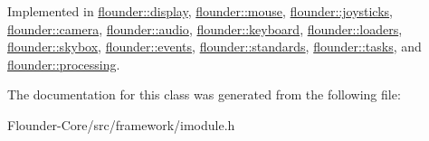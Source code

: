 Implemented in \hyperlink{classflounder_1_1display_a799c6a76fcac1a0ca56dfd6b8d7993fa}{flounder\+::display}, \hyperlink{classflounder_1_1mouse_aa1b1d60e1d1cf4ec7d19eaef65e040bc}{flounder\+::mouse}, \hyperlink{classflounder_1_1joysticks_a346fc03cae7164d6eb927333d1ae725f}{flounder\+::joysticks}, \hyperlink{classflounder_1_1camera_a6b2da3a1c348764d3cf954db5ac5b357}{flounder\+::camera}, \hyperlink{classflounder_1_1audio_aabff6a1996b8571404023b6ac17009b6}{flounder\+::audio}, \hyperlink{classflounder_1_1keyboard_a9fe79eabe905466fd90413d2c3b68841}{flounder\+::keyboard}, \hyperlink{classflounder_1_1loaders_a9becf522a74f35f7e3dc7839577ba736}{flounder\+::loaders}, \hyperlink{classflounder_1_1skybox_a9c961cf6d878f40f0294905415981234}{flounder\+::skybox}, \hyperlink{classflounder_1_1events_a7fc08fdb5dc615a924dd0d55996747dc}{flounder\+::events}, \hyperlink{classflounder_1_1standards_a681e682db67c10abb814cf0f8daf086a}{flounder\+::standards}, \hyperlink{classflounder_1_1tasks_a32e51c65b63e8c98097d5d40c1912e5c}{flounder\+::tasks}, and \hyperlink{classflounder_1_1processing_ac096299eb1b5b67739586900710d4206}{flounder\+::processing}.



The documentation for this class was generated from the following file\+:\begin{DoxyCompactItemize}
\item 
Flounder-\/\+Core/src/framework/imodule.\+h\end{DoxyCompactItemize}
